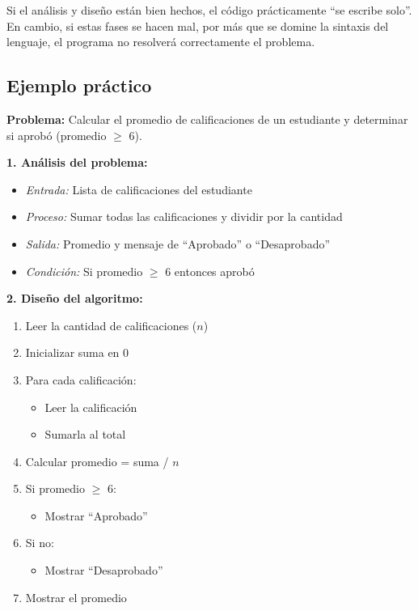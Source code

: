 \documentclass[12pt]{article}
\begin{document}
Si el análisis y diseño están bien hechos, el código prácticamente ``se escribe solo''. En cambio, si estas fases se hacen mal, por más que se domine la sintaxis del lenguaje, el programa no resolverá correctamente el problema.

\subsection{Ejemplo práctico}

\textbf{Problema:} Calcular el promedio de calificaciones de un estudiante y determinar si aprobó (promedio $\geq$ 6).

\textbf{1. Análisis del problema:}
\begin{itemize}
    \item \textit{Entrada:} Lista de calificaciones del estudiante
    \item \textit{Proceso:} Sumar todas las calificaciones y dividir por la cantidad
    \item \textit{Salida:} Promedio y mensaje de ``Aprobado'' o ``Desaprobado''
    \item \textit{Condición:} Si promedio $\geq$ 6 entonces aprobó
\end{itemize}

\textbf{2. Diseño del algoritmo:}
\begin{enumerate}
    \item Leer la cantidad de calificaciones ($n$)
    \item Inicializar suma en 0
    \item Para cada calificación:
    \begin{itemize}
        \item Leer la calificación
        \item Sumarla al total
    \end{itemize}
    \item Calcular promedio = suma / $n$
    \item Si promedio $\geq$ 6:
    \begin{itemize}
        \item Mostrar ``Aprobado''
    \end{itemize}
    \item Si no:
    \begin{itemize}
        \item Mostrar ``Desaprobado''
    \end{itemize}
    \item Mostrar el promedio
\end{enumerate}
\end{document}

